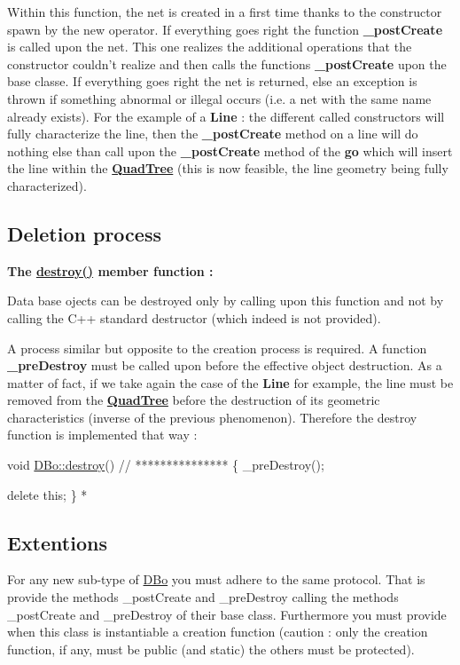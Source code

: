 Within this function, the net is created in a first time thanks to the constructor spawn by the new operator. If everything goes right the function {\bfseries \-\_\-post\-Create} is called upon the net. This one realizes the additional operations that the constructor couldn't realize and then calls the functions {\bfseries \-\_\-post\-Create} upon the base classe. If everything goes right the net is returned, else an exception is thrown if something abnormal or illegal occurs (i.\-e. a net with the same name already exists). For the example of a {\bfseries Line} \-: the different called constructors will fully characterize the line, then the {\bfseries \-\_\-post\-Create} method on a line will do nothing else than call upon the {\bfseries \-\_\-post\-Create} method of the {\bfseries go} which will insert the line within the {\bfseries \hyperlink{classHurricane_1_1QuadTree}{Quad\-Tree}} (this is now feasible, the line geometry being fully characterized).\hypertarget{classHurricane_1_1DBo_sDBodestroy}{}\subsection{Deletion process}\label{classHurricane_1_1DBo_sDBodestroy}
{\bfseries The \hyperlink{classHurricane_1_1DBo_a67febf5bf9c8b322674648688639728b}{destroy()} member function \-:}

Data base ojects can be destroyed only by calling upon this function and not by calling the C++ standard destructor (which indeed is not provided).

A process similar but opposite to the creation process is required. A function {\bfseries \-\_\-pre\-Destroy} must be called upon before the effective object destruction. As a matter of fact, if we take again the case of the {\bfseries Line} for example, the line must be removed from the {\bfseries \hyperlink{classHurricane_1_1QuadTree}{Quad\-Tree}} before the destruction of its geometric characteristics (inverse of the previous phenomenon). Therefore the destroy function is implemented that way \-: 
\begin{DoxyCode}
\textcolor{keywordtype}{void} \hyperlink{classHurricane_1_1DBo_a67febf5bf9c8b322674648688639728b}{DBo::destroy}()
\textcolor{comment}{// ***************}
\{
  \_preDestroy();
                
  \textcolor{keyword}{delete} \textcolor{keyword}{this};
\}
 *  
\end{DoxyCode}
\hypertarget{classHurricane_1_1DBo_sDBoExtentions}{}\subsection{Extentions}\label{classHurricane_1_1DBo_sDBoExtentions}
For any new sub-\/type of \hyperlink{classHurricane_1_1DBo}{D\-Bo} you must adhere to the same protocol. That is provide the methods \-\_\-post\-Create and \-\_\-pre\-Destroy calling the methods \-\_\-post\-Create and \-\_\-pre\-Destroy of their base class. Furthermore you must provide when this class is instantiable a creation function (caution \-: only the creation function, if any, must be {\ttfamily public} (and {\ttfamily static}) the others must be {\ttfamily protected}).

